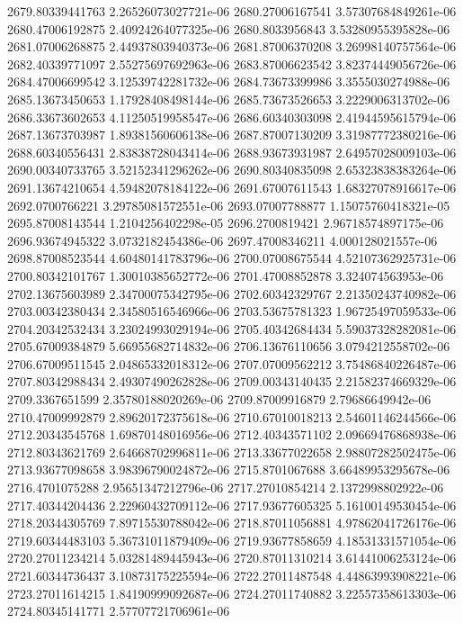 {2679.80339441763 2.26526073027721e-06
2680.27006167541 3.57307684849261e-06
2680.47006192875 2.40924264077325e-06
2680.8033956843 3.53280955395828e-06
2681.07006268875 2.44937803940373e-06
2681.87006370208 3.26998140757564e-06
2682.40339771097 2.55275697692963e-06
2683.87006623542 3.82374449056726e-06
2684.47006699542 3.12539742281732e-06
2684.73673399986 3.3555030274988e-06
2685.13673450653 1.17928408498144e-06
2685.73673526653 3.2229006313702e-06
2686.33673602653 4.11250519958547e-06
2686.60340303098 2.41944595615794e-06
2687.13673703987 1.89381560606138e-06
2687.87007130209 3.31987772380216e-06
2688.60340556431 2.83838728043414e-06
2688.93673931987 2.64957028009103e-06
2690.00340733765 3.52152341296262e-06
2690.80340835098 2.65323838383264e-06
2691.13674210654 4.59482078184122e-06
2691.67007611543 1.68327078916617e-06
2692.0700766221 3.29785081572551e-06
2693.07007788877 1.15075760418321e-05
2695.87008143544 1.2104256402298e-05
2696.2700819421 2.96718574897175e-06
2696.93674945322 3.0732182454386e-06
2697.47008346211 4.000128021557e-06
2698.87008523544 4.60480141783796e-06
2700.07008675544 4.52107362925731e-06
2700.80342101767 1.30010385652772e-06
2701.47008852878 3.324074563953e-06
2702.13675603989 2.34700075342795e-06
2702.60342329767 2.21350243740982e-06
2703.00342380434 2.34580516546966e-06
2703.53675781323 1.96725497059533e-06
2704.20342532434 3.23024993029194e-06
2705.40342684434 5.59037328282081e-06
2705.67009384879 5.66955682714832e-06
2706.13676110656 3.0794212558702e-06
2706.67009511545 2.04865332018312e-06
2707.07009562212 3.75486840226487e-06
2707.80342988434 2.49307490262828e-06
2709.00343140435 2.21582374669329e-06
2709.3367651599 2.35780188020269e-06
2709.87009916879 2.79686649942e-06
2710.47009992879 2.89620172375618e-06
2710.67010018213 2.54601146244566e-06
2712.20343545768 1.69870148016956e-06
2712.40343571102 2.09669476868938e-06
2712.80343621769 2.64668702996811e-06
2713.33677022658 2.98807282502475e-06
2713.93677098658 3.98396790024872e-06
2715.8701067688 3.66489953295678e-06
2716.4701075288 2.95651347212796e-06
2717.27010854214 2.1372998802922e-06
2717.40344204436 2.22960432709112e-06
2717.93677605325 5.16100149530454e-06
2718.20344305769 7.89715530788042e-06
2718.87011056881 4.97862041726176e-06
2719.60344483103 5.36731011879409e-06
2719.93677858659 4.18531331571054e-06
2720.27011234214 5.03281489445943e-06
2720.87011310214 3.61441006253124e-06
2721.60344736437 3.10873175225594e-06
2722.27011487548 4.44863993908221e-06
2723.27011614215 1.84190999092687e-06
2724.27011740882 3.22557358613303e-06
2724.80345141771 2.57707721706961e-06
}
